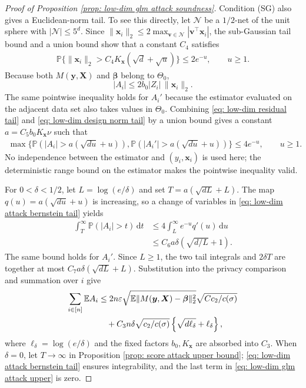 \documentclass[letterpaper,12pt]{article}
\renewcommand{\d}{\mathrm{d}}
\numberwithin{equation}{section}
\theoremstyle{plain}
\numberwithin{Theorem}{section}
\numberwithin{proposition}{section}
\numberwithin{Lemma}{section}
{
	\theoremstyle{definition}
	\newtheorem{Definition}{Definition}
	\newtheorem{example}{Example}
	\numberwithin{example}{section}
	\newtheorem{fact}{Fact}
	\numberwithin{fact}{section}
	\newtheorem{remark}{Remark}
}
\newcommand{\Pro}{\mathbb{P}}
\newcommand{\1}{\mathbbm{1}}
\def\bbeta{{\boldsymbol{\beta}}}
\def\E{\mathbb{E}}
\begin{document}
\begin{proof}[Proof of Proposition \ref{prop: low-dim glm attack soundness}]
			Condition (SG) also gives a Euclidean-norm tail. To see this
			directly, let $\mathcal N$ be a $1/2$-net of the unit sphere
			with $|\mathcal N|\leq5^d$. Since
			$\|\bm x_i\|_2\leq2\max_{\bm v\in\mathcal N}
			|\bm v^\top\bm x_i|$, the sub-Gaussian tail bound and a union
			bound show that a constant $C_4$ satisfies
			\begin{align}\label{eq: low-dim design norm tail}
				\Pro\{\|\bm x_i\|_2>C_4K_{\bm x}(\sqrt d+\sqrt u)\}
				\leq2e^{-u},\qquad u\geq1.
			\end{align}
			Because both $M(\bm y,\bm X)$ and $\bbeta$ belong to
			$\Theta_0$,
			\[
				|A_i|\leq2b_0|Z_i|\,\|\bm x_i\|_2.
			\]
			The same pointwise inequality holds for $A_i'$ because the
			estimator evaluated on the adjacent data set also takes values
			in $\Theta_0$. Combining \eqref{eq: low-dim residual tail} and
			\eqref{eq: low-dim design norm tail} by a union bound gives a
			constant $a=C_5b_0K_{\bm x}\nu$ such that
			\begin{align}\label{eq: low-dim attack bernstein tail}
				\max\{\Pro(|A_i|>a(\sqrt{du}+u)),
				\Pro(|A_i'|>a(\sqrt{du}+u))\}
				\leq4e^{-u},\qquad u\geq1.
			\end{align}
			No independence between the estimator and $(y_i,\bm x_i)$ is
			used here; the deterministic range bound on the estimator
			makes the pointwise inequality valid.

			For $0<\delta<1/2$, let $L=\log(e/\delta)$ and set
			$T=a(\sqrt{dL}+L)$. The map
			$q(u)=a(\sqrt{du}+u)$ is increasing, so a change of variables
			in \eqref{eq: low-dim attack bernstein tail} yields
			\begin{align*}
				\int_T^\infty\Pro(|A_i|>t)\,\d t
				&\leq4\int_L^\infty e^{-u}q'(u)\,\d u\\
				&\leq C_6a\delta\left(\sqrt{d/L}+1\right).
			\end{align*}
			The same bound holds for $A_i'$. Since $L\geq1$, the two tail
			integrals and $2\delta T$ are together at most
			$C_7a\delta(\sqrt{dL}+L)$. Substitution into the privacy
			comparison and summation over $i$ give
			\begin{align}\label{eq: low-dim glm attack upper}
				\sum_{i \in [n]} \E A_i
				&\leq 2n\varepsilon
				\sqrt{\E\|M(\bm y, \bm X) - \bbeta\|^2_2}
				\sqrt{Cc_2/c(\sigma)}\notag\\
				&\quad+C_3n\delta\sqrt{c_2/c(\sigma)}
				\left\{\sqrt{d\ell_\delta}+\ell_\delta\right\},
			\end{align}
			where $\ell_\delta=\log(e/\delta)$ and the fixed factors
			$b_0,K_{\bm x}$ are absorbed into $C_3$. When $\delta=0$,
			let $T\to\infty$ in Proposition
			\ref{prop: score attack upper bound};
			\eqref{eq: low-dim attack bernstein tail} ensures
			integrability, and the last term in
			\eqref{eq: low-dim glm attack upper} is zero.
	
\end{proof}
\end{document}
